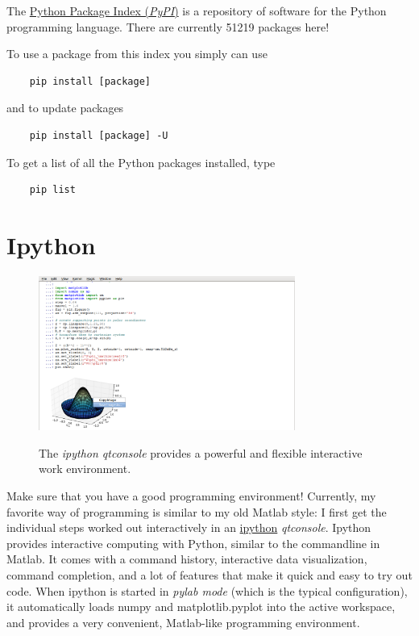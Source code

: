 The \href{https://pypi.python.org/pypi}{Python Package Index (\emph{PyPI})} is a repository of software for the Python programming language. There are currently 51219 packages here!

To use a package from this index you simply can use

\begin{lstlisting}
    pip install [package]
\end{lstlisting}

and to update packages

\begin{lstlisting}
    pip install [package] -U
\end{lstlisting}

To get a list of all the Python packages installed, type

\begin{lstlisting}
    pip list
\end{lstlisting}


\section{Ipython}

\begin{figure}
  \centering
  \includegraphics[width=0.75\textwidth]{../Images/ipython-qtconsole.png}\\
  \caption{The \emph{ipython qtconsole} provides a powerful and flexible interactive work environment.}
\end{figure}

Make sure that you have a good programming environment! Currently, my favorite way of programming is
similar to my old Matlab style: I first get the individual steps worked out interactively in an
\href{http://ipython.org/}{ipython} \emph{qtconsole}. Ipython  provides interactive computing with Python, similar to the commandline in Matlab. It comes with a command history, interactive data visualization, command completion, and a lot of features that make it quick and easy to try out code. When ipython is started in \emph{pylab mode} (which is the typical configuration), it automatically loads numpy and matplotlib.pyplot into the active workspace, and provides a very convenient, Matlab-like programming environment.

